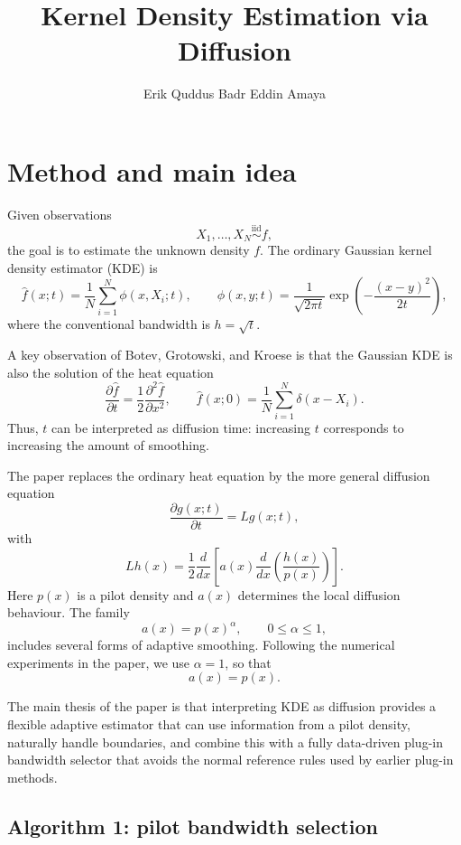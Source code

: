 \documentclass{article}
\title{Kernel Density Estimation via Diffusion}
\author{
  Erik Quddus
  \And
  Badr Eddin Amaya
}
\begin{document}
\maketitle



\section{Method and main idea}

Given observations
\[
X_1,\ldots,X_N \overset{\mathrm{iid}}{\sim} f,
\]
the goal is to estimate the unknown density $f$. The ordinary Gaussian
kernel density estimator (KDE) is
\[
\widehat f(x;t)
=
\frac{1}{N}
\sum_{i=1}^{N}
\phi(x,X_i;t),
\qquad
\phi(x,y;t)
=
\frac{1}{\sqrt{2\pi t}}
\exp\left(
-\frac{(x-y)^2}{2t}
\right),
\]
where the conventional bandwidth is $h=\sqrt{t}$.

A key observation of Botev, Grotowski, and Kroese
\citep{botev2010} is that the Gaussian KDE is also the solution of the
heat equation
\[
\frac{\partial \widehat f}{\partial t}
=
\frac{1}{2}
\frac{\partial^2 \widehat f}{\partial x^2},
\qquad
\widehat f(x;0)
=
\frac{1}{N}
\sum_{i=1}^{N}\delta(x-X_i).
\]
Thus, $t$ can be interpreted as diffusion time: increasing $t$
corresponds to increasing the amount of smoothing.

The paper replaces the ordinary heat equation by the more general
diffusion equation
\[
\frac{\partial g(x;t)}{\partial t}
=
Lg(x;t),
\]
with
\[
Lh(x)
=
\frac{1}{2}
\frac{d}{dx}
\left[
a(x)
\frac{d}{dx}
\left(
\frac{h(x)}{p(x)}
\right)
\right].
\]
Here $p(x)$ is a pilot density and $a(x)$ determines the local diffusion
behaviour. The family
\[
a(x)=p(x)^\alpha,
\qquad 0\leq\alpha\leq1,
\]
includes several forms of adaptive smoothing. Following the numerical
experiments in the paper, we use $\alpha=1$, so that
\[
a(x)=p(x).
\]

The main thesis of the paper is that interpreting KDE as diffusion
provides a flexible adaptive estimator that can use information from a
pilot density, naturally handle boundaries, and combine this with a
fully data-driven plug-in bandwidth selector that avoids the normal
reference rules used by earlier plug-in methods.


\subsection{Algorithm 1: pilot bandwidth selection}
\end{document}
